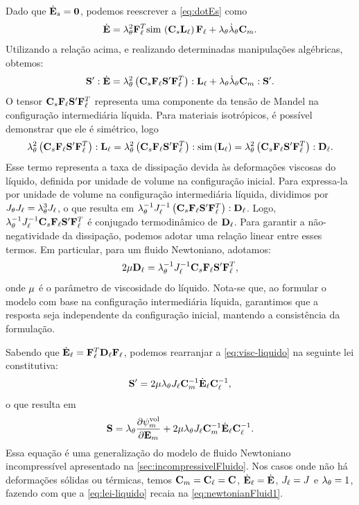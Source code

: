 \documentclass[Tese.tex]{subfiles}
\begin{document}
Dado que $\dot{\mathbf{E}}_s = \mathbf{0}$, podemos reescrever a \cref{eq:dotEs} como
\begin{equation}
\dot{\mathbf{E}} = \lambda_{\theta}^2\mathbf{F}_\ell^T\text{sim}\,\left(\mathbf{C}_s\mathbf{L}_\ell\right)\mathbf{F}_\ell + \lambda_{\theta}\dot{\lambda}_{\theta}\mathbf{C}_m.
\end{equation}
Utilizando a relação acima, e realizando determinadas manipulações algébricas, obtemos:
\begin{equation}\label{eq:SE-liquid}
\mathbf{S}':\dot{\mathbf{E}} = \lambda_{\theta}^2\left(\mathbf{C}_s\mathbf{F}_\ell\mathbf{S}'\mathbf{F}_\ell^T\right):\mathbf{L}_\ell + \lambda_{\theta}\dot{\lambda}_{\theta}\mathbf{C}_m:\mathbf{S}'.
\end{equation}
O tensor $\mathbf{C}_s\mathbf{F}_\ell\mathbf{S}'\mathbf{F}_\ell^T$ representa uma componente da tensão de Mandel na configuração intermediária líquida. Para materiais isotrópicos, é possível demonstrar que ele é simétrico, logo
\begin{equation}
\lambda_{\theta}^2\left(\mathbf{C}_s\mathbf{F}_\ell\mathbf{S}'\mathbf{F}_\ell^T\right):\mathbf{L}_\ell = \lambda_{\theta}^2\left(\mathbf{C}_s\mathbf{F}_\ell\mathbf{S}'\mathbf{F}_\ell^T\right):\text{sim}\,(\mathbf{L}_\ell) = \lambda_{\theta}^2\left(\mathbf{C}_s\mathbf{F}_\ell\mathbf{S}'\mathbf{F}_\ell^T\right):\mathbf{D}_\ell.
\end{equation}
Esse termo representa a taxa de dissipação devida às deformações viscosas do líquido, definida por unidade de volume na configuração inicial. Para expressa-la por unidade de volume na configuração intermediária líquida, dividimos por $J_{\theta}J_\ell = \lambda_{\theta}^3J_\ell$, o que resulta em  $\lambda_{\theta}^{-1}J_\ell^{-1}\left(\mathbf{C}_s\mathbf{F}_\ell\mathbf{S}'\mathbf{F}_\ell^T\right):\mathbf{D}_\ell$. Logo, $\lambda_{\theta}^{-1}J_\ell^{-1}\mathbf{C}_s\mathbf{F}_\ell\mathbf{S}'\mathbf{F}_\ell^T$ é conjugado termodinâmico de $\mathbf{D}_\ell$. Para garantir a não-negatividade da dissipação, podemos adotar uma relação linear entre esses termos. Em particular, para um fluido Newtoniano, adotamos:
\begin{equation}\label{eq:visc-liquido}
2\mu\mathbf{D}_\ell = \lambda_{\theta}^{-1}J_\ell^{-1}\mathbf{C}_s\mathbf{F}_\ell\mathbf{S}'\mathbf{F}_\ell^T,
\end{equation}
onde $\mu$ é o parâmetro de viscosidade do líquido. Nota-se que, ao formular o modelo com base na configuração intermediária líquida, garantimos que a resposta seja independente da configuração inicial, mantendo a consistência da formulação.

Sabendo que $\dot{\mathbf{E}}_\ell = \mathbf{F}_\ell^T\mathbf{D}_\ell\mathbf{F}_\ell$, podemos rearranjar a \cref{eq:visc-liquido} na seguinte lei constitutiva:
\begin{equation}\label{eq:lei-liquido}
\mathbf{S}' = 2\mu\lambda_{\theta}J_\ell\mathbf{C}_m^{-1}\dot{\mathbf{E}}_\ell\mathbf{C}_\ell^{-1},
\end{equation}
o que resulta em 
\begin{equation}\label{eq:lei-liquido-S}
\mathbf{S} = \lambda_{\theta}\dfrac{\partial\psi_m^\text{vol}}{\partial\mathbf{E}_m} + 2\mu\lambda_{\theta}J_\ell\mathbf{C}_m^{-1}\dot{\mathbf{E}}_\ell\mathbf{C}_\ell^{-1}.
\end{equation}
Essa equação é uma generalização do modelo de fluido Newtoniano incompressível apresentado na \cref{sec:incompressivelFluido}. Nos casos onde não há deformações sólidas ou térmicas, temos $\mathbf{C}_m=\mathbf{C}_\ell=\mathbf{C}$, $\dot{\mathbf{E}}_\ell = \dot{\mathbf{E}}$, $J_\ell=J$ e $\lambda_{\theta}=1$, fazendo com que a \cref{eq:lei-liquido} recaia na \cref{eq:newtonianFluid1}.
\end{document}

